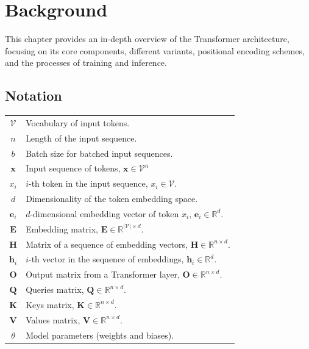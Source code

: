 \chapter{Background}\label{background}

This chapter provides an in-depth overview of the Transformer architecture, focusing on its core components, different variants, positional encoding schemes, and the processes of training and inference.

\section*{Notation}\label{sec:notation}

\begin{center}
    \begin{tabular}{cl}
        $\mathcal{V}$ \qquad & Vocabulary of input tokens.                                                          \\
        $n$                  & Length of the input sequence.                                                        \\
        $b$                  & Batch size for batched input sequences.                                              \\
        $\mathbf{x}$         & Input sequence of tokens, $\mathbf{x} \in \mathcal{V}^{n}$                           \\
        $x_i$                & $i$-th token in the input sequence, $x_i \in \mathcal{V}$.                           \\
        $d$                  & Dimensionality of the token embedding space.                                         \\
        $\mathbf{e}_i$       & $d$-dimensional embedding vector of token $x_i$, $\mathbf{e}_i \in \mathbb{R}^d$.    \\
        $\mathbf{E}$         & Embedding matrix, $\mathbf{E} \in \mathbb{R}^{|\mathcal{V}| \times d}$.              \\
        $\mathbf{H}$         & Matrix of a sequence of embedding vectors, $\mathbf{H} \in \mathbb{R}^{n \times d}$. \\
        $\mathbf{h}_i$       & $i$-th vector in the sequence of embeddings, $\mathbf{h}_i \in \mathbb{R}^d$.        \\
        $\mathbf{O}$         & Output matrix from a Transformer layer, $\mathbf{O} \in \mathbb{R}^{n \times d}$.    \\
        $\mathbf{Q}$         & Queries matrix, $\mathbf{Q} \in \mathbb{R}^{n \times d}$.                            \\
        $\mathbf{K}$         & Keys matrix, $\mathbf{K} \in \mathbb{R}^{n \times d}$.                               \\
        $\mathbf{V}$         & Values matrix, $\mathbf{V} \in \mathbb{R}^{n \times d}$.                             \\
        $\theta$             & Model parameters (weights and biases).                                               \\
    \end{tabular}
\end{center}

